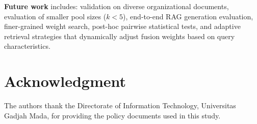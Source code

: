 \documentclass[conference]{IEEEtran}
\begin{document}
\noindent\textbf{Future work} includes: validation on diverse organizational
documents, evaluation of smaller pool sizes ($k < 5$), end-to-end RAG
generation evaluation, finer-grained weight search, post-hoc pairwise
statistical tests, and adaptive retrieval strategies that dynamically
adjust fusion weights based on query characteristics.

\section*{Acknowledgment}
The authors thank the Directorate of Information Technology, Universitas
Gadjah Mada, for providing the policy documents used in this study.



\end{document}
